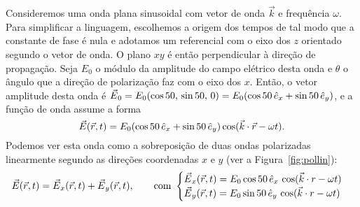 Consideremos uma onda plana sinusoidal com vetor de onda $\vec k$ e
frequência $\omega$. Para simplificar a linguagem, escolhemos a origem dos
tempos de tal modo que a constante de fase é nula e adotamos um referencial com
o eixo dos $z$ orientado segundo o vetor de onda. O plano $xy$ é então
perpendicular à direção de propagação. Seja $E_0$ o módulo da amplitude do campo
elétrico desta onda e $\theta$ o ângulo que a direção de polarização faz com o
eixo dos $x$. Então, o vetor amplitude desta onda é $\vec
E_0=E_0(\cos\theta,\,\sin\theta,\,0)= E_0(\cos\theta\,\he_x+\sin\theta\,\he_y)$,
e a função de onda assume a forma
\begin{equation*}
\vec E(\vec r,t)=E_0(\cos\theta\,\he_x+\sin\theta\,\he_y)
\cos(\vec k\cdot\vec r-\omega t).
\end{equation*}
Podemos ver esta onda como a sobreposição de duas ondas polarizadas linearmente
segundo as direções coordenadas $x$ e $y$ (ver a Figura~\ref{fig:pollin}):
\begin{equation}\label{eq:lpdec}
\vec E(\vec r,t)=\vec E_x(\vec r,t)+\vec E_y(\vec r,t),\qquad\text{com }
\begin{cases}
\vec E_x(\vec r,t)=E_0\cos\theta\,\he_x\,\cos(\vec k\cdot r-\omega t)\\
\vec E_y(\vec r,t)=E_0\sin\theta\,\he_y\,\cos(\vec k\cdot r-\omega t)
\end{cases}
\end{equation}
